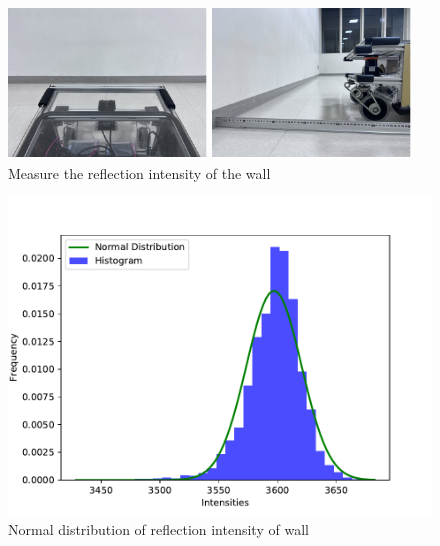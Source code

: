   \begin{figure}[h]
    \centering
    \begin{minipage}[c]{65mm} 
        \centering
        \includegraphics[height=40mm]{images/pdf/RobotGuidance_exp1_wall_from_back}
    \end{minipage}
    \begin{minipage}[c]{65mm} 
        \centering
        \includegraphics[height=40mm]{images/pdf/RobotGuidance_exp1_wall_from_side}
    \end{minipage}
    \caption{Measure the reflection intensity of the wall}
    \label{Fig:RobotGuidance_exp1_wall}
  \end{figure}

  \begin{figure}[h]
    \centering
    \includegraphics[keepaspectratio, scale=0.50] {images/pdf/RobotGuidance_plot_reflection_intensities_of_wall}
    \captionsetup{justification=raggedright} %
    \caption{Normal distribution of reflection intensity of wall}
    \label{Fig:Normal distribution of reflection intensity of wall}
  \end{figure}

